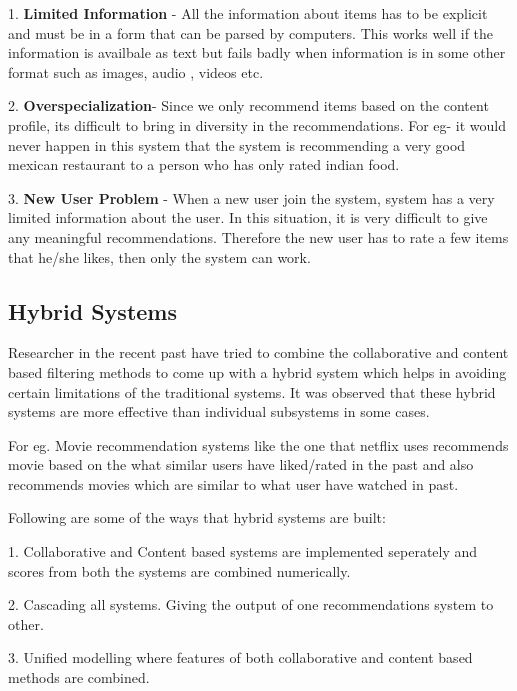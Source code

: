 1. {\bf Limited Information} - All the information about items has to be explicit and must be in a form that can be parsed by computers. This works well if the information is availbale as text but fails badly when information is in some other format such as images, audio , videos etc.

2. {\bf Overspecialization}- Since we only recommend items based on the content profile, its difficult to bring in diversity in the recommendations. For eg- it would never happen in this system that the system is recommending a very good mexican restaurant to a person who has only rated indian food.

3. {\bf New User Problem} - When a new user join the system, system has a very limited information about the user. In this situation, it is very difficult to give any meaningful recommendations. Therefore the new user has to rate a few items that he/she likes, then only the system can work. 

\subsection{Hybrid Systems}
Researcher in the recent past have tried to combine the collaborative and content based filtering methods to come up with a hybrid system which helps in avoiding certain limitations of the traditional systems. It was observed that these hybrid systems are more effective than individual subsystems in some cases.

For eg. Movie recommendation systems like the one that netflix uses recommends movie based on the what similar users have liked/rated in the past and also recommends movies which are similar to what user have watched in past.

Following are some of the ways that hybrid systems are built:

1. Collaborative and Content based systems are implemented seperately and scores from both the systems are combined numerically.

2. Cascading all systems. Giving the output of one recommendations system to other.

3. Unified modelling where features of both collaborative and content based methods are combined. 
